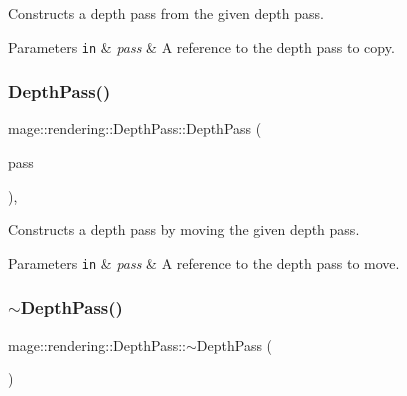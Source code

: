 Constructs a depth pass from the given depth pass.


\begin{DoxyParams}[1]{Parameters}
\mbox{\tt in}  & {\em pass} & A reference to the depth pass to copy. \\
\hline
\end{DoxyParams}
\hypertarget{classmage_1_1rendering_1_1_depth_pass_a7157b0a6480a1fca6001e4eb93b4e5fd}{}\label{classmage_1_1rendering_1_1_depth_pass_a7157b0a6480a1fca6001e4eb93b4e5fd} 
\subsubsection{\texorpdfstring{Depth\+Pass()}{DepthPass()}\hspace{0.1cm}{\footnotesize\ttfamily [3/3]}}
{\footnotesize\ttfamily mage\+::rendering\+::\+Depth\+Pass\+::\+Depth\+Pass (\begin{DoxyParamCaption}\item[{\hyperlink{classmage_1_1rendering_1_1_depth_pass}{Depth\+Pass} \&\&}]{pass }\end{DoxyParamCaption})\hspace{0.3cm}{\ttfamily [default]}, {\ttfamily [noexcept]}}

Constructs a depth pass by moving the given depth pass.


\begin{DoxyParams}[1]{Parameters}
\mbox{\tt in}  & {\em pass} & A reference to the depth pass to move. \\
\hline
\end{DoxyParams}
\hypertarget{classmage_1_1rendering_1_1_depth_pass_a5ad944e2a8f93e2f4bf5f9f97641e003}{}\label{classmage_1_1rendering_1_1_depth_pass_a5ad944e2a8f93e2f4bf5f9f97641e003} 
\subsubsection{\texorpdfstring{$\sim$\+Depth\+Pass()}{~DepthPass()}}
{\footnotesize\ttfamily mage\+::rendering\+::\+Depth\+Pass\+::$\sim$\+Depth\+Pass (\begin{DoxyParamCaption}{ }\end{DoxyParamCaption})\hspace{0.3cm}{\ttfamily [default]}}


